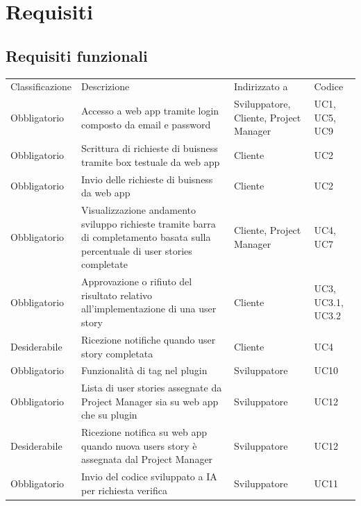 \documentclass{article}
\begin{document}
\newpage
\section{Requisiti}
\subsection{Requisiti funzionali}
\begin{center}
    \begin{tabular}{|p{3cm}|p{6cm}|p{}|p{3cm}|}
    \rowcolor{Blue} 
\hline
Classificazione & Descrizione & Indirizzato a&Codice  \\ 
\rowcolor{LightBlue}
\hline
Obbligatorio & Accesso a web app tramite login composto da email e password & Sviluppatore, Cliente, Project Manager & UC1, UC5, UC9 \\ 
\rowcolor{LighterBlue}
\hline
Obbligatorio & Scrittura di richieste di buisness tramite box testuale da web app & Cliente & UC2\\ 
\rowcolor{LightBlue}
\hline
Obbligatorio & Invio delle richieste di buisness da web app & Cliente & UC2\\
\hline
\rowcolor{LighterBlue}

Obbligatorio & Visualizzazione andamento sviluppo richieste tramite barra di completamento basata sulla percentuale di user stories completate & Cliente, Project Manager & UC4, UC7\\
\rowcolor{LightBlue}
\hline
Obbligatorio & Approvazione o rifiuto del risultato relativo all'implementazione di una user story & Cliente & UC3, UC3.1, UC3.2\\
\hline
\rowcolor{LighterBlue}

Desiderabile & Ricezione notifiche quando user story completata & Cliente & UC4\\
\hline
\rowcolor{LightBlue}
\hline
Obbligatorio & Funzionalità di tag nel plugin  & Sviluppatore & UC10\\
\hline
\rowcolor{LighterBlue}

Obbligatorio & Lista di user stories assegnate da Project Manager sia su web app che su plugin & Sviluppatore & UC12\\
\hline
\rowcolor{LightBlue}

Desiderabile & Ricezione notifica su web app quando nuova users story è assegnata dal Project Manager& Sviluppatore & UC12\\
\hline
\rowcolor{LighterBlue}
Obbligatorio & Invio del codice sviluppato a IA per richiesta verifica& Sviluppatore & UC11\\


\end{tabular}
\end{center}
\end{document}

